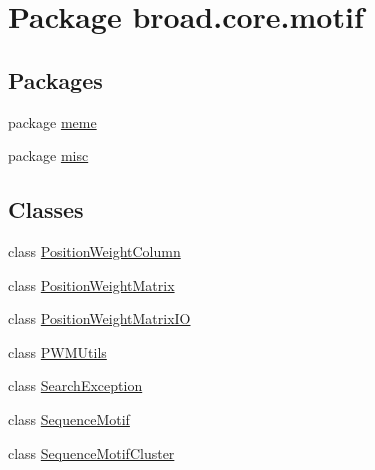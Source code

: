 \hypertarget{namespacebroad_1_1core_1_1motif}{\section{Package broad.\+core.\+motif}
\label{namespacebroad_1_1core_1_1motif}
}
\subsection*{Packages}
\begin{DoxyCompactItemize}
\item 
package \hyperlink{namespacebroad_1_1core_1_1motif_1_1meme}{meme}
\item 
package \hyperlink{namespacebroad_1_1core_1_1motif_1_1misc}{misc}
\end{DoxyCompactItemize}
\subsection*{Classes}
\begin{DoxyCompactItemize}
\item 
class \hyperlink{classbroad_1_1core_1_1motif_1_1_position_weight_column}{Position\+Weight\+Column}
\item 
class \hyperlink{classbroad_1_1core_1_1motif_1_1_position_weight_matrix}{Position\+Weight\+Matrix}
\item 
class \hyperlink{classbroad_1_1core_1_1motif_1_1_position_weight_matrix_i_o}{Position\+Weight\+Matrix\+I\+O}
\item 
class \hyperlink{classbroad_1_1core_1_1motif_1_1_p_w_m_utils}{P\+W\+M\+Utils}
\item 
class \hyperlink{classbroad_1_1core_1_1motif_1_1_search_exception}{Search\+Exception}
\item 
class \hyperlink{classbroad_1_1core_1_1motif_1_1_sequence_motif}{Sequence\+Motif}
\item 
class \hyperlink{classbroad_1_1core_1_1motif_1_1_sequence_motif_cluster}{Sequence\+Motif\+Cluster}
\end{DoxyCompactItemize}
